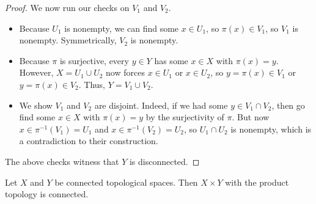 \documentclass[../notes.tex]{subfiles}
\begin{document}
\begin{proof}
	We now run our checks on $V_1$ and $V_2$.
	\begin{itemize}
		\item Because $U_1$ is nonempty, we can find some $x\in U_1$, so $\pi(x)\in V_1$, so $V_1$ is nonempty. Symmetrically, $V_2$ is nonempty.
		\item Because $\pi$ is surjective, every $y\in Y$ has some $x\in X$ with $\pi(x)=y$. However, $X=U_1\cup U_2$ now forces $x\in U_1$ or $x\in U_2$, so $y=\pi(x)\in V_1$ or $y=\pi(x)\in V_2$. Thus, $Y=V_1\cup V_2$.
		\item We show $V_1$ and $V_2$ are disjoint. Indeed, if we had some $y\in V_1\cap V_2$, then go find some $x\in X$ with $\pi(x)=y$ by the surjectivity of $\pi$. But now $x\in\pi^{-1}(V_1)=U_1$ and $x\in\pi^{-1}(V_2)=U_2$, so $U_1\cap U_2$ is nonempty, which is a contradiction to their construction.
	\end{itemize}
	The above checks witness that $Y$ is disconnected.
\end{proof}
\begin{proposition}
	Let $X$ and $Y$ be connected topological spaces. Then $X\times Y$ with the product topology is connected.
\end{proposition}
\end{document}
